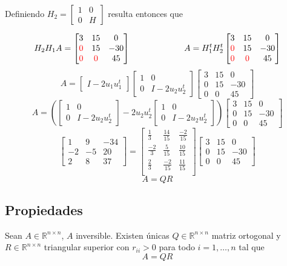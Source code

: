 \noindent Definiendo $H_2 = \begin{bmatrix}
    1 & 0 \\
    0 & H
\end{bmatrix}$ resulta entonces que

\[
H_{2}H_{1}A = \begin{bmatrix}
    3 & 15 & 0 \\
    \textcolor{red}{0} & 15 & -30 \\
    \textcolor{red}{0} & \textcolor{red}{0} & 45
\end{bmatrix}
~~~~~~~~~~~~~~~~~~~
A = H_{1}^{t}H_{2}^{t}\begin{bmatrix}
    3 & 15 & 0 \\
    \textcolor{red}{0} & 15 & -30 \\
    \textcolor{red}{0} & \textcolor{red}{0} & 45
\end{bmatrix}
\]
\[A = \begin{bmatrix}
    I - 2u_{1}u_{1}^{t}
\end{bmatrix}\begin{bmatrix}
    1 & 0 \\
    0 & I - 2u_{2}u_{2}^{t}
\end{bmatrix}\begin{bmatrix}
    3 & 15 & 0 \\
    0 & 15 & -30 \\
    0 & 0 & 45
\end{bmatrix}
\]
\[A = (\begin{bmatrix}
    1 & 0 \\ 0 & I - 2u_{2}u_{2}^{t}
\end{bmatrix} - 2u_{2}u_{2}^{t}\begin{bmatrix}
    1 & 0 \\
    0 & I - 2u_{2}u_{2}^{t}
\end{bmatrix}) \begin{bmatrix}
    3 & 15 & 0 \\
    0 & 15 & -30 \\
    0 & 0 & 45
\end{bmatrix}
\]
\[\begin{bmatrix}
    1 & 9 & -34 \\
    -2 & -5 & 20 \\
    2 & 8 & 37
\end{bmatrix} = 
\begin{bmatrix}
    \frac{1}{3} & \frac{14}{15} & \frac{-2}{15} \\
    \frac{-2}{3} & \frac{5}{15} & \frac{10}{15} \\
    \frac{2}{3} & \frac{-2}{15} & \frac{11}{15} \\
\end{bmatrix}\begin{bmatrix}
    3 & 15 & 0 \\
    0 & 15 & -30 \\
    0 & 0 & 45
\end{bmatrix}
\]
\[A = QR\]

\subsection{Propiedades}\label{subsec:propiedades_qr}

Sean $A \in \mathbb{R}^{n \times n}$, $A$ inversible. 
Existen únicas $Q \in \mathbb{R}^{n \times n}$ matriz ortogonal y $R \in \mathbb{R}^{n \times n}$ triangular superior con $r_{ii} > 0$ para todo $i = 1,\ldots,n$ tal que 
\[A = QR\]

